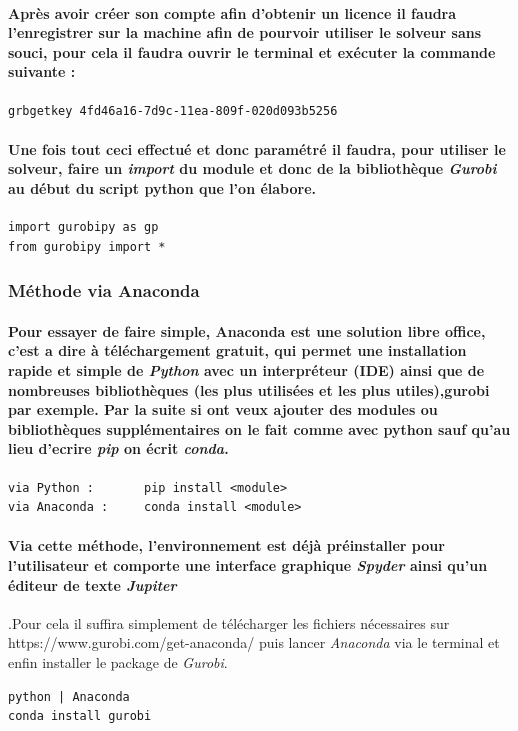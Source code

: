 \documentclass[a4paper, 12pt, twoside]{article}
\begin{document}
\paragraph{Après avoir créer son compte afin d'obtenir un licence il faudra l'enregistrer sur la machine afin de pourvoir utiliser le solveur sans souci, pour cela il faudra ouvrir le terminal et exécuter la commande suivante :}
\begin{verbatim}
grbgetkey 4fd46a16-7d9c-11ea-809f-020d093b5256
\end{verbatim}
\paragraph{Une fois tout ceci effectué et donc paramétré il faudra, pour utiliser le solveur, faire un \textit{import} du module et donc de la bibliothèque \textit{Gurobi} au début du script python que l'on élabore.}
\begin{verbatim}
import gurobipy as gp
from gurobipy import *
\end{verbatim}

\subsubsection{Méthode via Anaconda }
\paragraph{Pour essayer de faire simple, Anaconda est une solution libre office, c'est a dire à téléchargement gratuit, qui permet une installation rapide et simple de \textit{Python} avec un interpréteur (IDE) ainsi que de nombreuses bibliothèques (les plus utilisées et les plus utiles),gurobi par exemple. Par la suite si ont veux ajouter des modules ou bibliothèques supplémentaires  on le fait comme avec python sauf qu'au lieu d'ecrire \textit{pip} on écrit \textit{conda}.}
\begin{verbatim}
via Python :       pip install <module>
via Anaconda :     conda install <module>
\end{verbatim}

\paragraph{Via cette méthode, l'environnement est déjà préinstaller pour l'utilisateur et comporte une interface graphique \textit{Spyder} ainsi qu'un éditeur de texte \textit{Jupiter}}.Pour cela il suffira simplement de télécharger les fichiers nécessaires sur https://www.gurobi.com/get-anaconda/ puis lancer \textit{Anaconda} via le terminal et enfin installer le package de \textit{Gurobi}.
\begin{verbatim}
python | Anaconda
conda install gurobi 
\end{verbatim}
\end{document}
